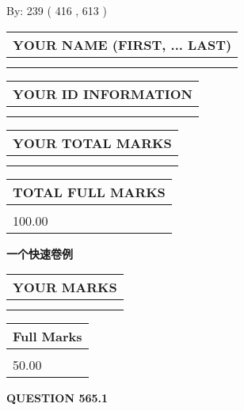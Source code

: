 \documentclass{ctexart}
\begin{document}
   
\hspace{1.0in} By: 
 239 ( 416 ,  613 )
   
   
   
   
\newpage 
\setcounter{page}{ 
   565001 } 
   
   
   
   
\noindent\begin{tabular}{|l|}
\hline
YOUR NAME (FIRST, ... LAST)  \\
\hline
 \\ 
 \\ 
\hline
\end{tabular}
\hspace{0.05in} \begin{tabular}{|l|}
\hline
 YOUR   ID   INFORMATION  \\
\hline
 \\ 
 \\ 
\hline
\end{tabular}
   
   
\vspace{0.2in}\noindent\begin{tabular}{|l|}
\hline
YOUR TOTAL MARKS  \\
\hline
 \\ 
 \\ 
\hline
\end{tabular}
\hspace{0.05in} \begin{tabular}{|l|}
\hline
TOTAL FULL MARKS  \\
\hline
 \\ 
100.00 \\
\hline
\end{tabular}
   
   
 \vspace{0.2in}
{\LARGE {\textbf{ 一个快速卷例}}}
   
   
  
\vspace{0.2in}
  
\noindent\begin{tabular}{|l|}
\hline
 YOUR MARKS  \\
\hline
 \\ 
 \\ 
\hline
\end{tabular}
\hspace{0.05in} \begin{tabular}{|l|}
\hline
 Full Marks  \\
\hline
 \\ 
50.00 \\
\hline
\end{tabular}
{\textbf{\Large{QUESTION
565.1 
}}}
  
\end{document}
